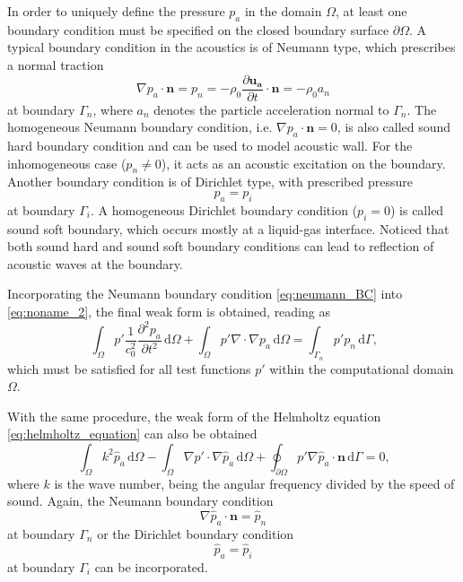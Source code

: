 In order to uniquely define the pressure $p_a$ in the domain $\Omega$, at least one boundary condition must be specified on the closed boundary surface $\partial \Omega$. A typical boundary condition in the acoustics is of Neumann type, which prescribes a normal traction
\begin{equation}
	\nabla p_a \cdot \boldsymbol{n} = p_n = -\rho_0\frac{\partial \boldsymbol{u_a}}{\partial t}\cdot\boldsymbol{n} = -\rho_0 a_n \label{eq:neumann_BC}
\end{equation}
at boundary $\Gamma_n$, where $a_n$ denotes the particle acceleration normal to $\Gamma_n$. The homogeneous Neumann boundary condition, i.e. $\nabla p_a \cdot \boldsymbol{n} = 0$, is also called sound hard boundary condition and can be used to model acoustic wall. For the inhomogeneous case ($p_n \neq 0$), it acts as an acoustic excitation on the boundary. Another boundary condition is of Dirichlet type, with prescribed pressure
\begin{equation}
	p_a = p_i \label{eq:dirichlet_BC}
\end{equation}
at boundary $\Gamma_i$. A homogeneous Dirichlet boundary condition ($p_i = 0$) is called sound soft boundary, which occurs mostly at a liquid-gas interface. Noticed that both sound hard and sound soft boundary conditions can lead to reflection of acoustic waves at the boundary.

Incorporating the Neumann boundary condition \cref{eq:neumann_BC} into \cref{eq:noname_2}, the final weak form is obtained, reading as
\begin{equation}
		\int_{\Omega}p'\frac{1}{c_0^2}\frac{\partial^2 p_a}{\partial t^2}\,\text{d}\Omega + \int_{\Omega}p'\nabla\cdot\nabla p_a\,\text{d}\Omega = \int_{\Gamma_n}p'p_n\,\text{d}\Gamma\text{,}
\end{equation}
which must be satisfied for all test functions $p'$ within the computational domain $\Omega$.

With the same procedure, the weak form of the Helmholtz equation \cref{eq:helmholtz_equation} can also be obtained
\begin{equation}
	\int_{\Omega}k^2\hat{p}_a\,\text{d}\Omega - \int_{\Omega}\nabla p' \cdot \nabla\hat{p}_a\,\text{d}\Omega + \oint_{\partial\Omega} p'\nabla \hat{p}_a \cdot \boldsymbol{n}\,\text{d}\Gamma = 0 \text{,}
\end{equation}
where $k$ is the wave number, being the angular frequency divided by the speed of sound. Again, the Neumann boundary condition
\begin{equation}
	\nabla\hat{p}_a \cdot\boldsymbol{n} = \hat{p}_n
\end{equation}
at boundary $\Gamma_n$ or the Dirichlet boundary condition
\begin{equation}
	\hat{p}_a = \hat{p}_i
\end{equation}
at boundary $\Gamma_i$ can be incorporated.
\newpage

